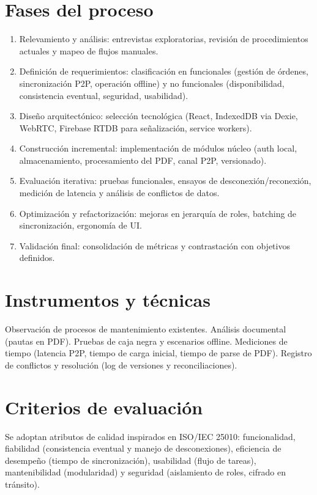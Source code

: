 \documentclass[12pt,a4paper]{report}
\begin{document}
\section*{Fases del proceso} 
\begin{enumerate} 
    \item Relevamiento y análisis: entrevistas exploratorias, revisión de procedimientos actuales y mapeo de flujos manuales. 
    
    \item Definición de requerimientos: clasificación en funcionales (gestión de órdenes, sincronización P2P, operación offline) y no funcionales (disponibilidad, consistencia eventual, seguridad, usabilidad). 

    \item Diseño arquitectónico: selección tecnológica (React, IndexedDB via Dexie, WebRTC, Firebase RTDB para señalización, service workers). 

    \item Construcción incremental: implementación de módulos núcleo (auth local, almacenamiento, procesamiento del PDF, canal P2P, versionado). 

    \item Evaluación iterativa: pruebas funcionales, ensayos de desconexión/reconexión, medición de latencia y análisis de conflictos de datos. 

    \item Optimización y refactorización: mejoras en jerarquía de roles, batching de sincronización, ergonomía de UI. 

    \item Validación final: consolidación de métricas y contrastación con objetivos definidos. 
\end{enumerate}

\section*{Instrumentos y técnicas}

Observación de procesos de mantenimiento existentes.
Análisis documental (pautas en PDF).
Pruebas de caja negra y escenarios offline.
Mediciones de tiempo (latencia P2P, tiempo de carga inicial, tiempo de parse de PDF).
Registro de conflictos y resolución (log de versiones y reconciliaciones).

\section*{Criterios de evaluación} Se adoptan atributos de calidad inspirados en ISO/IEC 25010: funcionalidad, fiabilidad (consistencia eventual y manejo de desconexiones), eficiencia de desempeño (tiempo de sincronización), usabilidad (flujo de tareas), mantenibilidad (modularidad) y seguridad (aislamiento de roles, cifrado en tránsito).
\end{document}

